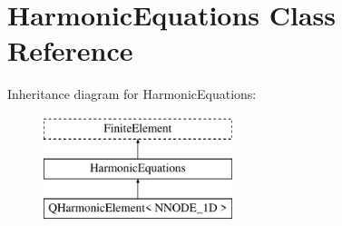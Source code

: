 \hypertarget{classHarmonicEquations}{}\section{Harmonic\+Equations Class Reference}
\label{classHarmonicEquations}
Inheritance diagram for Harmonic\+Equations\+:\begin{figure}[H]
\begin{center}
\leavevmode
\includegraphics[height=3.000000cm]{classHarmonicEquations}
\end{center}
\end{figure}
